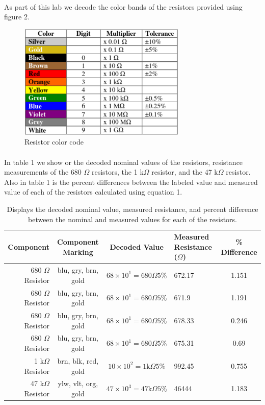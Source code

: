 \documentclass{article}
\begin{document}
\paragraph{}
As part of this lab we decode the color bands of the resistors provided using figure 2.

\begin{figure}[H]
	\begin{center}
		\includegraphics[width=8cm]{lab_1_figure_2}
	\end{center}
	\caption{Resistor color code}
\end{figure}

\paragraph{}
In table 1 we show or the decoded nominal values of the resistors, resistance measurements of the 680 $\Omega$ resistors, the 1 k$\Omega$ resistor, and the 47 k$\Omega$ resistor. Also in table 1 is the percent differences between the labeled value and measured value of each of the resistors calculated using equation 1.

\begin{table}[H]
\begin{tabularx}{\textwidth}{ | r | c | c | X | c | }
	\hline
	\textbf{Component} &
	\textbf{Component Marking} &
	\textbf{Decoded Value} &
	\textbf{Measured Resistance ($\Omega$)} &
	\textbf{\% Difference} \\
	\hline
	680 $\Omega$ Resistor & blu, gry, brn, gold & $68 \times 10^{1}=680 \Omega 5 \%$ & 672.17 & 1.151 \\
	\hline
	680 $\Omega$ Resistor & blu, gry, brn, gold & $68 \times 10^{1}=680 \Omega 5 \%$ & 671.9 & 1.191 \\
	\hline
	680 $\Omega$ Resistor & blu, gry, brn, gold & $68 \times 10^{1}=680 \Omega 5 \%$ & 678.33 & 0.246 \\
	\hline
	680 $\Omega$ Resistor & blu, gry, brn, gold & $68 \times 10^{1}=680 \Omega 5 \%$ & 675.31 & 0.69 \\
	\hline
	1 k$\Omega$ Resistor & brn, blk, red, gold & $10 \times 10^{2}=1 \text{k} \Omega 5 \%$ & 992.45 & 0.755 \\
	\hline
	47 k$\Omega$ Resistor & ylw, vlt, org, gold & $47 \times 10^{3}=47 \text{k} \Omega 5 \%$ & 46444 & 1.183 \\
	\hline
\end{tabularx}
\caption{\label{tab:table-name}Displays the decoded nominal value, measured resistance, and percent difference between the nominal and measured values for each of the resistors.}
\end{table}
\end{document}
